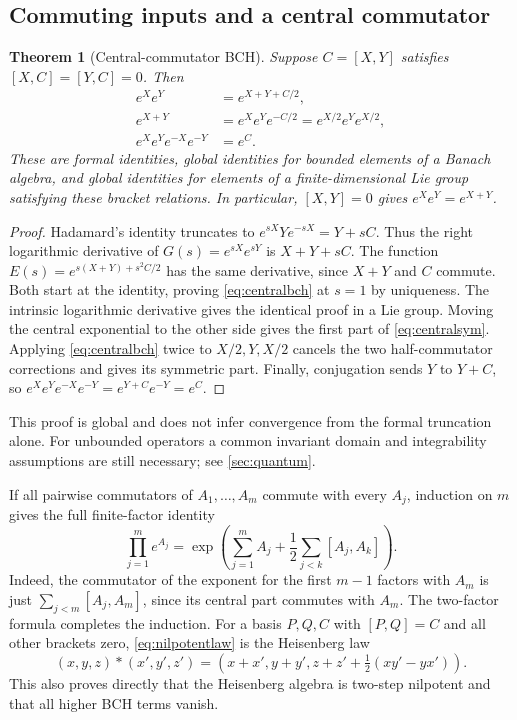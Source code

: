 \documentclass[11pt]{article}
\numberwithin{equation}{section}
\newtheorem{theorem}{Theorem}[section]
\theoremstyle{definition}
\theoremstyle{remark}
\begin{document}
\subsection{Commuting inputs and a central commutator}
\begin{theorem}[Central-commutator BCH]\label{thm:central}
Suppose $C=[X,Y]$ satisfies $[X,C]=[Y,C]=0$. Then
\begin{align}
 e^Xe^Y&=e^{X+Y+C/2},\label{eq:centralbch}\\
 e^{X+Y}&=e^Xe^Ye^{-C/2}
        =e^{X/2}e^Ye^{X/2},\label{eq:centralsym}\\
 e^Xe^Ye^{-X}e^{-Y}&=e^C.\label{eq:groupcomm}
\end{align}
These are formal identities, global identities for bounded elements
of a Banach algebra, and global identities for elements of a
finite-dimensional Lie group satisfying these bracket relations.
In particular, $[X,Y]=0$ gives $e^Xe^Y=e^{X+Y}$.
\end{theorem}
\begin{proof}
Hadamard's identity truncates to
$e^{sX}Ye^{-sX}=Y+sC$. Thus the right logarithmic derivative of
$G(s)=e^{sX}e^{sY}$ is $X+Y+sC$. The function
$E(s)=e^{s(X+Y)+s^2C/2}$ has the same derivative, since $X+Y$ and
$C$ commute. Both start at the identity, proving
\eqref{eq:centralbch} at $s=1$ by uniqueness. The intrinsic
logarithmic derivative gives the identical proof in a Lie group.
Moving the central exponential to the other side gives the first
part of \eqref{eq:centralsym}. Applying \eqref{eq:centralbch}
twice to $X/2,Y,X/2$ cancels the two half-commutator corrections
and gives its symmetric part. Finally, conjugation sends $Y$ to
$Y+C$, so $e^Xe^Ye^{-X}e^{-Y}=e^{Y+C}e^{-Y}=e^C$.
\end{proof}
This proof is global and does not infer convergence from the
formal truncation alone. For unbounded operators a common invariant
domain and integrability assumptions are still necessary; see
\cref{sec:quantum}.

If all pairwise commutators of $A_1,\ldots,A_m$ commute with every
$A_j$, induction on $m$ gives the full finite-factor identity
\begin{equation}\label{eq:centralmulti}
 \prod_{j=1}^m e^{A_j}
 =\exp\left(\sum_{j=1}^m A_j+
             \frac12\sum_{j<k}[A_j,A_k]\right).
\end{equation}
Indeed, the commutator of the exponent for the first $m-1$ factors
with $A_m$ is just $\sum_{j<m}[A_j,A_m]$, since its central part
commutes with $A_m$. The two-factor formula completes the induction.
For a basis $P,Q,C$ with $[P,Q]=C$ and all other brackets zero,
\eqref{eq:nilpotentlaw} is the Heisenberg law
\begin{equation}\label{eq:heisenberglaw}
 (x,y,z)*(x',y',z')=
 (x+x',y+y',z+z'+\tfrac12(xy'-yx')).
\end{equation}
This also proves directly that the Heisenberg algebra is two-step
nilpotent and that all higher BCH terms vanish.
\end{document}

